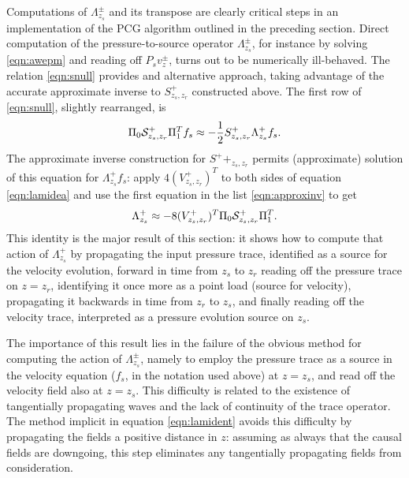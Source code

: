 \documentclass[georeport,12pt]{geophysics}
\begin{document}
Computations of $\Lambda^{\pm}_{z_s}$ and its transpose are clearly critical steps in an
implementation of the PCG algorithm outlined in the preceding section.
Direct computation of the pressure-to-source operator $\Lambda^{\pm}_{z_s}$, for instance by solving
\ref{eqn:awepm} and reading off $P_sv^{\pm}_{z}$, turns out to be
numerically ill-behaved. The relation \ref{eqn:snull} provides and
alternative approach, taking advantage of the accurate approximate
inverse to $S^+_{z_s,z_r}$ constructed above. The first row of
\ref{eqn:snull}, slightly rearranged, is
\begin{equation}
  \label{eqn:lamidea}
  \Pi_0{\cal S}^+_{z_s,z_r}\Pi_1^T f_s \approx  -\frac{1}{2} S^+_{z_s,z_r}\Lambda^+_{z_s}f_s.
\end{equation}
The approximate inverse construction for $S^++_{z_s,z_r}$ permits (approximate)
solution of this equation for $\Lambda^+_{z_s}f_s$: apply
$4(V^{+}_{z_s,z_r})^T$ to both sides of equation \ref{eqn:lamidea} and
use the first equation in the list \ref{eqn:approxinv} to get
\begin{equation}
  \label{eqn:lamident}
  \Lambda^+_{z_s} \approx -8(V^{+}_{z_s,z_r})^T\Pi_0 {\cal S}^+_{z_s,z_r}\Pi_1^T.
\end{equation}
This identity is the major result of this section: it shows how
to compute that action of $\Lambda^+_{z_s}$ by propagating the input
pressure trace, identified as a source for the velocity evolution,
forward in time from $z_s$ to $z_r$
reading off the pressure trace on $z=z_r$, identifying it once more as
a point load (source for velocity), propagating it backwards in time from $z_r$ to
$z_s$, and finally reading off the velocity trace, interpreted as a
pressure evolution source on $z_s$. 

The importance of this result lies in the failure of the obvious
method for computing the action of $\Lambda^{\pm}_{z_s}$, namely to
employ the pressure trace as a source in the velocity equation ($f_s$,
in the notation used above) at $z=z_s$, and read off the velocity
field also at $z=z_s$. This difficulty is related to the existence of
tangentially propagating waves and the lack of continuity of the trace
operator. The method implicit in equation \ref{eqn:lamident} avoids
this difficulty by propagating the fields a positive distance in $z$:
assuming as always that the causal fields are downgoing, this step
eliminates any tangentially propagating fields from consideration.
\end{document}
